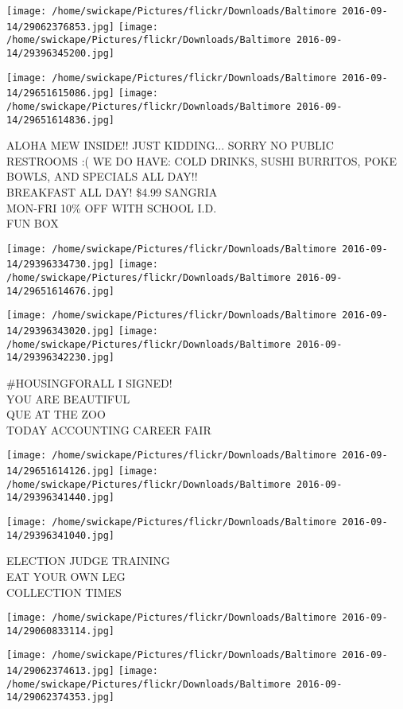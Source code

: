 \documentclass[10pt,letterpaper]{article}
\begin{document}
\texttt{[image: /home/swickape/Pictures/flickr/Downloads/Baltimore 2016-09-14/29062376853.jpg]}
\texttt{[image: /home/swickape/Pictures/flickr/Downloads/Baltimore 2016-09-14/29396345200.jpg]}

\texttt{[image: /home/swickape/Pictures/flickr/Downloads/Baltimore 2016-09-14/29651615086.jpg]}
\texttt{[image: /home/swickape/Pictures/flickr/Downloads/Baltimore 2016-09-14/29651614836.jpg]}

ALOHA MEW INSIDE!! JUST KIDDING...  SORRY NO PUBLIC RESTROOMS :( WE DO HAVE: COLD DRINKS, SUSHI BURRITOS, POKE BOWLS, AND SPECIALS ALL DAY!!\\
BREAKFAST ALL DAY!  \$4.99 SANGRIA\\
MON{-}FRI 10\% OFF WITH SCHOOL I.D.\\
FUN BOX
\pagebreak

\texttt{[image: /home/swickape/Pictures/flickr/Downloads/Baltimore 2016-09-14/29396334730.jpg]}
\texttt{[image: /home/swickape/Pictures/flickr/Downloads/Baltimore 2016-09-14/29651614676.jpg]}

\texttt{[image: /home/swickape/Pictures/flickr/Downloads/Baltimore 2016-09-14/29396343020.jpg]}
\texttt{[image: /home/swickape/Pictures/flickr/Downloads/Baltimore 2016-09-14/29396342230.jpg]}

\#HOUSINGFORALL I SIGNED!\\
YOU ARE BEAUTIFUL\\
QUE AT THE ZOO\\
TODAY ACCOUNTING CAREER FAIR
\pagebreak

\texttt{[image: /home/swickape/Pictures/flickr/Downloads/Baltimore 2016-09-14/29651614126.jpg]}
\texttt{[image: /home/swickape/Pictures/flickr/Downloads/Baltimore 2016-09-14/29396341440.jpg]}

\texttt{[image: /home/swickape/Pictures/flickr/Downloads/Baltimore 2016-09-14/29396341040.jpg]}

ELECTION JUDGE TRAINING\\
EAT YOUR OWN LEG\\
COLLECTION TIMES
\pagebreak

\texttt{[image: /home/swickape/Pictures/flickr/Downloads/Baltimore 2016-09-14/29060833114.jpg]}

\vspace{0.25in}
\texttt{[image: /home/swickape/Pictures/flickr/Downloads/Baltimore 2016-09-14/29062374613.jpg]}
\texttt{[image: /home/swickape/Pictures/flickr/Downloads/Baltimore 2016-09-14/29062374353.jpg]}
\end{document}
